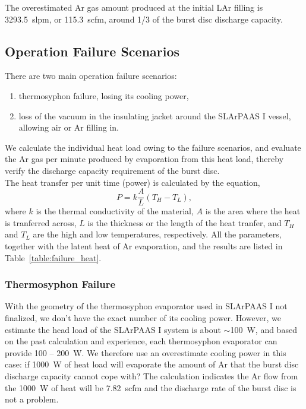 The overestimated Ar gas amount produced at the initial LAr filling
is 3293.5~slpm, or 115.3~scfm, around 1/3 of the burst disc discharge capacity.

\subsection{Operation Failure Scenarios}

There are two main operation failure scenarios:
\begin{enumerate}
    \item thermosyphon failure, losing its cooling power,
    \item loss of the vacuum in the insulating jacket around the SLArPAAS I vessel, 
    allowing air or Ar filling in.
\end{enumerate}
We calculate the individual heat load owing to the failure scenarios,
and evaluate the Ar gas per minute produced by evaporation from this heat load,
thereby verify the discharge capacity requirement of the burst disc.\\

The heat transfer per unit time (power) is calculated by the equation,
\begin{equation}
    \label{eq:heat_transfer}
    P = k\frac{A}{L}(T_H-T_L),
\end{equation}
where $k$ is the thermal conductivity of the material, $A$ is the area where
the heat is tranferred across, $L$ is the thickness or the length of the 
heat tranfer, and $T_H$ and $T_L$ are the high and low temperatures, respectively.
All the parameters, together with the latent heat of Ar evaporation,
and the results
are listed in Table~\ref{table:failure_heat}.



\subsubsection{Thermosyphon Failure}

With the geometry of the thermosyphon evaporator used in SLArPAAS I not finalized,
we don't have the exact number of its cooling power.
However, we estimate the head load of the SLArPAAS I system is about $\sim$100~W,
and based on the past calculation and experience, each thermosyphon evaporator
can provide 100 -- 200~W.
We therefore use an overestimate cooling power in this case: if 1000~W
of heat load will evaporate the amount of Ar that the burst disc discharge capacity
cannot cope with?
The calculation indicates the Ar flow from the 1000~W of heat will be 7.82~scfm
and the discharge rate of the burst disc is not a problem.

